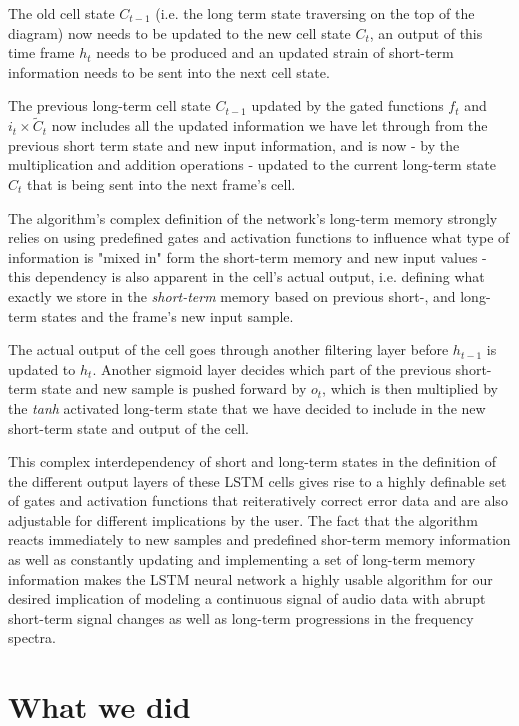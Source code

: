 \documentclass[conference]{IEEEtran}
\begin{document}
The old cell state $C_{t-1}$ (i.e. the long term state traversing on the top of the diagram) now needs to be updated to the new cell state $C_t$, an output of this time frame $h_t$ needs to be produced and an updated strain of short-term information needs to be sent into the next cell state. 

The previous long-term cell state $C_{t-1}$ updated by the gated functions $f_t$ and $i_t \times \tilde{C}_t$ now includes all the updated information we have let through from the previous short term state and new input information, and is now - by the multiplication and addition operations - updated to the current long-term state $C_t$ that is being sent into the next frame's cell. 

The algorithm's complex definition of the network's long-term memory strongly relies on using predefined gates and activation functions to influence what type of information is "mixed in" form the short-term memory and new input values - this dependency is also apparent in the cell's actual output, i.e. defining what exactly we store in the \textit{short-term} memory based on previous short-, and long-term states and the frame's new input sample. 

The actual output of the cell goes through another filtering layer before $h_{t-1}$ is updated to $h_t$. Another sigmoid layer decides which part of the previous short-term state and new sample is pushed forward by $o_t$, which is then multiplied by the \textit{tanh} activated long-term state that we have decided to include in the new short-term state and output of the cell.

This complex interdependency of short and long-term states in the definition of the different output layers of these LSTM cells gives rise to a highly definable set of gates and activation functions that reiteratively correct error data and are also adjustable for different implications by the user. The fact that the algorithm reacts immediately to new samples and predefined shor-term memory information as well as constantly updating and implementing a set of long-term memory information makes the LSTM neural network a highly usable algorithm for our desired implication of modeling a continuous signal of audio data with abrupt short-term signal changes as well as long-term progressions in the frequency spectra.

\section{What we did}
\end{document}
